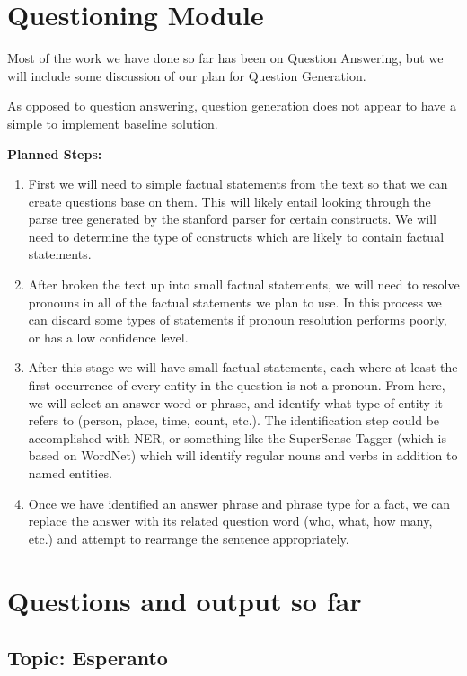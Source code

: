 \documentclass[12pt]{article}
\begin{document}
\section{Questioning Module} %

Most of the work we have done so far has been on Question Answering, but we will include some discussion of our plan for Question Generation.

As opposed to question answering, question generation does not appear to have a simple to implement baseline solution. 

\textbf{Planned Steps:}

\begin{enumerate}
\item First we will need to simple factual statements from the text so that we can create questions base on them. This will likely entail looking through the parse tree generated by the stanford parser for certain constructs. We will need to determine the type of constructs which are likely to contain factual statements.
\item After broken the text up into small factual statements, we will need to resolve pronouns in all of the factual statements we plan to use. In this process we can discard some types of statements if pronoun resolution performs poorly, or has a low confidence level.
\item After this stage we will have small factual statements, each where at least the first occurrence of every entity in the question is not a pronoun. From here, we will select an answer word or phrase, and identify what type of entity it refers to (person, place, time, count, etc.). The identification step could be accomplished with NER, or something like the SuperSense Tagger (which is based on WordNet) which will identify regular nouns and verbs in addition to named entities. 
\item Once we have identified an answer phrase and phrase type for a fact, we can replace the answer with its related question word (who, what, how many, etc.) and attempt to rearrange the sentence appropriately.
\end{enumerate}

\section{Questions and output so far}

\subsection{Topic: Esperanto}
\end{document}
